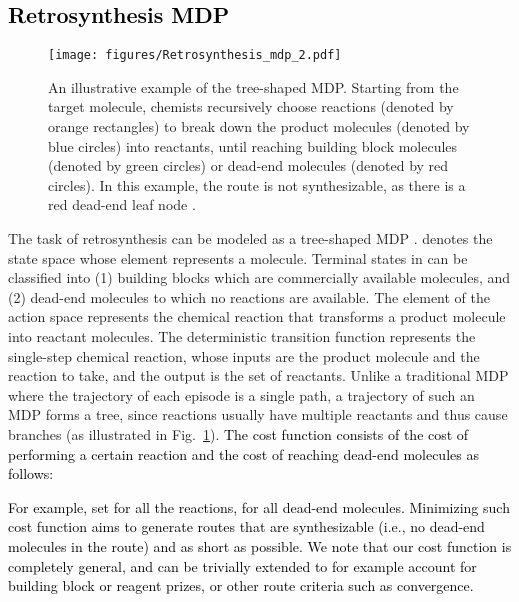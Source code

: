 \documentclass[nohyperref]{article}
\theoremstyle{plain}
\theoremstyle{definition}
\theoremstyle{remark}
\begin{document}
\subsection{\textcolor{black}{Retrosynthesis MDP}}\label{sec:formulation}





\begin{figure}[t]
\centerline{\texttt{[image: figures/Retrosynthesis\_mdp\_2.pdf]}}
\caption{
An illustrative example of the tree-shaped MDP. 
Starting from the target molecule, chemists recursively choose reactions (denoted by orange rectangles) to break down the product molecules (denoted by blue circles) into reactants, until reaching building block molecules (denoted by green circles) or dead-end molecules (denoted by red circles).
In this example, the route is not synthesizable, as there is a red dead-end leaf node . 
}
\label{fig:mdp}
\end{figure}


The task of retrosynthesis can be modeled as a 
tree-shaped MDP .
 denotes the state space whose element  represents a molecule. Terminal states in  can be classified into (1) building blocks  which are commercially available molecules, and (2) dead-end molecules  to which no reactions are available. 
The element of the action space  represents the chemical reaction that transforms a product molecule into reactant molecules. 
The deterministic transition function  represents the single-step chemical reaction, whose inputs are the product molecule and the reaction to take, and the output is the set of reactants. 
Unlike a traditional MDP 
where the trajectory
of each episode is a single path,
a trajectory of such an MDP forms a tree, since reactions usually have multiple reactants and thus cause branches (as illustrated in Fig.~\ref{fig:mdp}).
\textcolor{black}{The cost function  consists of the cost of performing a certain reaction  and the cost of
reaching dead-end molecules  as follows:
}





\textcolor{black}{For example, \citep{simulated_experience} set  for all the reactions,  for all dead-end molecules. Minimizing such cost function aims to generate routes that are synthesizable (i.e., no dead-end molecules in the route) and as short as possible. We note that our cost function is completely general, and can be trivially extended to for example account for building block or reagent prizes, or other route criteria such as convergence.
}
\end{document}
